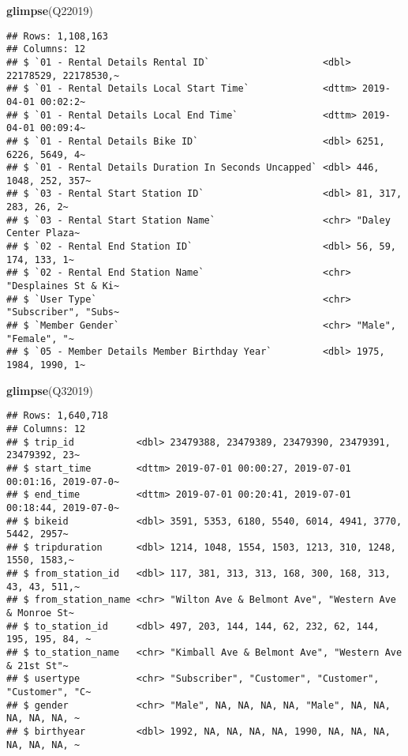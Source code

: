 \documentclass[
]{article}
\newenvironment{Shaded}{\begin{snugshade}}{\end{snugshade}}
\newcommand{\FunctionTok}[1]{\textcolor[rgb]{0.13,0.29,0.53}{\textbf{#1}}}
\newcommand{\NormalTok}[1]{#1}
\begin{document}
\begin{Shaded}
\begin{Highlighting}[]
\FunctionTok{glimpse}\NormalTok{(Q22019)}
\end{Highlighting}
\end{Shaded}

\begin{verbatim}
## Rows: 1,108,163
## Columns: 12
## $ `01 - Rental Details Rental ID`                    <dbl> 22178529, 22178530,~
## $ `01 - Rental Details Local Start Time`             <dttm> 2019-04-01 00:02:2~
## $ `01 - Rental Details Local End Time`               <dttm> 2019-04-01 00:09:4~
## $ `01 - Rental Details Bike ID`                      <dbl> 6251, 6226, 5649, 4~
## $ `01 - Rental Details Duration In Seconds Uncapped` <dbl> 446, 1048, 252, 357~
## $ `03 - Rental Start Station ID`                     <dbl> 81, 317, 283, 26, 2~
## $ `03 - Rental Start Station Name`                   <chr> "Daley Center Plaza~
## $ `02 - Rental End Station ID`                       <dbl> 56, 59, 174, 133, 1~
## $ `02 - Rental End Station Name`                     <chr> "Desplaines St & Ki~
## $ `User Type`                                        <chr> "Subscriber", "Subs~
## $ `Member Gender`                                    <chr> "Male", "Female", "~
## $ `05 - Member Details Member Birthday Year`         <dbl> 1975, 1984, 1990, 1~
\end{verbatim}

\begin{Shaded}
\begin{Highlighting}[]
\FunctionTok{glimpse}\NormalTok{(Q32019)}
\end{Highlighting}
\end{Shaded}

\begin{verbatim}
## Rows: 1,640,718
## Columns: 12
## $ trip_id           <dbl> 23479388, 23479389, 23479390, 23479391, 23479392, 23~
## $ start_time        <dttm> 2019-07-01 00:00:27, 2019-07-01 00:01:16, 2019-07-0~
## $ end_time          <dttm> 2019-07-01 00:20:41, 2019-07-01 00:18:44, 2019-07-0~
## $ bikeid            <dbl> 3591, 5353, 6180, 5540, 6014, 4941, 3770, 5442, 2957~
## $ tripduration      <dbl> 1214, 1048, 1554, 1503, 1213, 310, 1248, 1550, 1583,~
## $ from_station_id   <dbl> 117, 381, 313, 313, 168, 300, 168, 313, 43, 43, 511,~
## $ from_station_name <chr> "Wilton Ave & Belmont Ave", "Western Ave & Monroe St~
## $ to_station_id     <dbl> 497, 203, 144, 144, 62, 232, 62, 144, 195, 195, 84, ~
## $ to_station_name   <chr> "Kimball Ave & Belmont Ave", "Western Ave & 21st St"~
## $ usertype          <chr> "Subscriber", "Customer", "Customer", "Customer", "C~
## $ gender            <chr> "Male", NA, NA, NA, NA, "Male", NA, NA, NA, NA, NA, ~
## $ birthyear         <dbl> 1992, NA, NA, NA, NA, 1990, NA, NA, NA, NA, NA, NA, ~
\end{verbatim}
\end{document}
